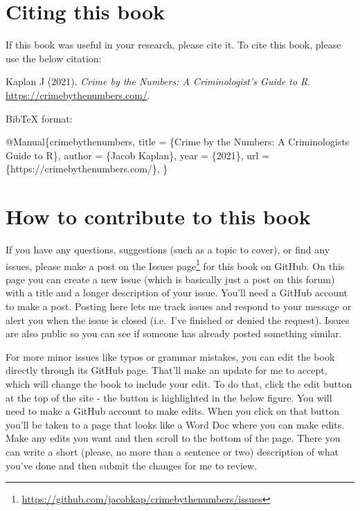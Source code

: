 \documentclass[
]{krantz}
\makeatletter
\newenvironment{Shaded}{\begin{snugshade}}{\end{snugshade}}
\newcommand{\DataTypeTok}[1]{\textcolor[rgb]{0.27,0.27,0.27}{#1}}
\newcommand{\NormalTok}[1]{#1}
\newcommand{\OtherTok}[1]{\textcolor[rgb]{0.37,0.37,0.37}{#1}}
\newcommand{\VariableTok}[1]{\textcolor[rgb]{0,0,0}{#1}}
\renewcommand{\href}[2]{#2\footnote{\url{#1}}}
\newenvironment{kframe}{%
\medskip{}
\setlength{\fboxsep}{.8em}
 \def\at@end@of@kframe{}%
 \ifinner\ifhmode%
  \def\at@end@of@kframe{\end{minipage}}%
  \begin{minipage}{\columnwidth}%
 \fi\fi%
 \def\FrameCommand##1{\hskip\@totalleftmargin \hskip-\fboxsep
 \colorbox{shadecolor}{##1}\hskip-\fboxsep
     \hskip-\linewidth \hskip-\@totalleftmargin \hskip\columnwidth}%
 \MakeFramed {\advance\hsize-\width
   \@totalleftmargin\z@ \linewidth\hsize
   \@setminipage}}%
 {\par\unskip\endMakeFramed%
 \at@end@of@kframe}
\renewenvironment{Shaded}{\begin{kframe}}{\end{kframe}}
\makeatother
\begin{document}
\hypertarget{citing-this-book}{%
\section{Citing this book}\label{citing-this-book}}

If this book was useful in your research, please cite it. To cite this book, please use the below citation:

Kaplan J (2021). \emph{Crime by the Numbers: A Criminologist's Guide to R}. \url{https://crimebythenumbers.com/}.

BibTeX format:

\begin{Shaded}
\begin{Highlighting}[]
\VariableTok{@Manual}\NormalTok{\{}\OtherTok{crimebythenumbers}\NormalTok{,}
  \DataTypeTok{title}\NormalTok{ = \{Crime by the Numbers: A Criminologist\textquotesingle{}s Guide to R\},}
  \DataTypeTok{author}\NormalTok{ = \{Jacob Kaplan\},}
  \DataTypeTok{year}\NormalTok{ = \{2021\},}
  \DataTypeTok{url}\NormalTok{ = \{https://crimebythenumbers.com/\},}
\NormalTok{\}}
\end{Highlighting}
\end{Shaded}

\hypertarget{how-to-contribute-to-this-book}{%
\section{How to contribute to this book}\label{how-to-contribute-to-this-book}}

If you have any questions, suggestions (such as a topic to cover), or find any issues, please make a post on the \href{https://github.com/jacobkap/crimebythenumbers/issues}{Issues page} for this book on GitHub. On this page you can create a new issue (which is basically just a post on this forum) with a title and a longer description of your issue. You'll need a GitHub account to make a post. Posting here lets me track issues and respond to your message or alert you when the issue is closed (i.e.~I've finished or denied the request). Issues are also public so you can see if someone has already posted something similar.

For more minor issues like typos or grammar mistakes, you can edit the book directly through its GitHub page. That'll make an update for me to accept, which will change the book to include your edit. To do that, click the edit button at the top of the site - the button is highlighted in the below figure. You will need to make a GitHub account to make edits. When you click on that button you'll be taken to a page that looks like a Word Doc where you can make edits. Make any edits you want and then scroll to the bottom of the page. There you can write a short (please, no more than a sentence or two) description of what you've done and then submit the changes for me to review.
\end{document}
